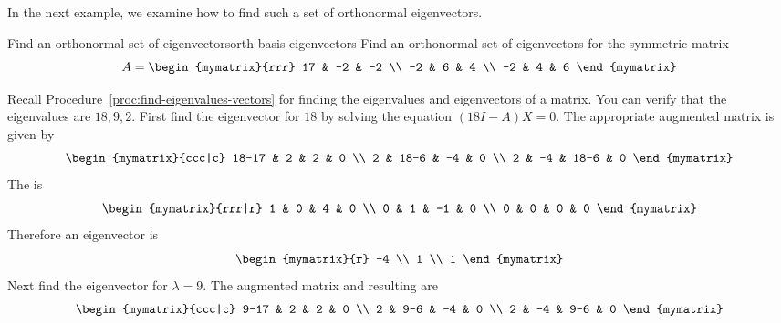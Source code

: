 In the next example, we examine how to find such a set of orthonormal eigenvectors.

\begin{example}{Find an orthonormal set of eigenvectors}{orth-basis-eigenvectors}
Find an orthonormal set of eigenvectors for the symmetric matrix
\begin{equation*}
A = \begin{mymatrix}{rrr}
17 & -2 & -2 \\
-2 & 6 & 4 \\
-2 & 4 & 6
\end{mymatrix}
\end{equation*}
\end{example}

\begin{solution}
Recall Procedure~\ref{proc:find-eigenvalues-vectors} for finding the eigenvalues and eigenvectors of a matrix. You can verify that the eigenvalues are $18,9,2$. First find the eigenvector for $18$ by solving the equation $(18I-A)X = 0$. 
The appropriate augmented matrix is given by  
\begin{equation*}
\begin{mymatrix}{ccc|c}
18-17 & 2 & 2 & 0 \\ 
2 & 18-6 & -4 & 0 \\ 
2 & -4 & 18-6 & 0
\end{mymatrix}
\end{equation*}
The {\rref} is 
\begin{equation*}
\begin{mymatrix}{rrr|r}
1 & 0 & 4 & 0 \\ 
0 & 1 & -1 & 0 \\ 
0 & 0 & 0 & 0
\end{mymatrix}
\end{equation*}
Therefore an eigenvector is 
\begin{equation*}
\begin{mymatrix}{r}
-4 \\ 
1 \\ 
1
\end{mymatrix}
\end{equation*}
Next find the eigenvector for $\lambda =9$. The augmented matrix and resulting {\rref} are 
\begin{equation*}
\begin{mymatrix}{ccc|c}
9-17 & 2 & 2 & 0 \\ 
2 & 9-6 & -4 & 0 \\ 
2 & -4 & 9-6 & 0
\end{mymatrix}

\end{equation*}
\end{solution}
